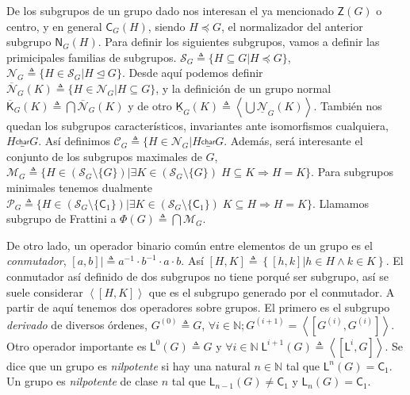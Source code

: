 \documentclass[12pt,a4paper,fleqn,spanish,final,openright]{extbook}
\theoremstyle{definition}
\theoremstyle{remark}
\begin{document}
De los subgrupos de un grupo dado nos interesan el ya mencionado $\mathsf{Z}(G)$
o centro, y en general $\mathsf{C}_{G}(H)$, siendo $H \preccurlyeq G$,
el normalizador del anterior subgrupo $\mathsf{N}_{G}(H)$. Para definir
los siguientes subgrupos, vamos a definir las primicipales familias
de subgrupos. 
$\mathcal{S}_{G}\triangleq\lbrace H \subseteq G\vert H \preccurlyeq G\rbrace$,
$\mathcal{N}_{G}\triangleq\lbrace H \in \mathcal{S}_{G}|H\trianglelefteq G\rbrace$. 
Desde aquí podemos definir 
$\mathcal{\overline N}_{G}(K)\triangleq\lbrace H \in \mathcal{N}_{G}\vert H\subseteq G\rbrace$, 
y la definición de un grupo normal 
${\overline{\mathsf{K}}}_{G}(K)\triangleq\bigcap\mathcal{\overline N}_{G}(K)$ 
y de otro 
${\underline{\mathsf{K}}}_{G}(K)\triangleq\left\langle\bigcup\mathcal{\underline N}_{G}(K)\right\rangle$.
También nos quedan los subgrupos característicos, invariantes ante
isomorfismos cualquiera, $ H \overset{\mathsf{{char}}}{\_} G $. Así definimos
$\mathcal{C}_{G}\triangleq\lbrace H \in \mathcal{N}_{G} \vert H \overset{\mathsf{{char}}}{\_} G$.
Además, será interesante el conjunto de los subgrupos maximales de $G$, 
$\mathcal{M}_{G} \triangleq
\lbrace H \in \left({\mathcal{S}_{G}}\setminus \lbrace G\rbrace\right) \vert
\exists K\in \left({\mathcal{S}_{G}}\setminus \lbrace G\rbrace\right)\; 
H \subseteq K \Rightarrow H=K\rbrace$. 
Para subgrupos minimales tenemos dualmente 
$\mathcal{P}_{G} \triangleq
\lbrace H \in \left({\mathcal{S}_{G}}\setminus \lbrace \mathsf{C}_{1}\rbrace\right) 
\vert \exists K \in \left({\mathcal{S}_{G}}\setminus \lbrace 
\mathsf{C}_{1}\rbrace\right)\; K \subseteq H \Rightarrow H=K\rbrace$. 
Llamamos subgrupo de Frattini a $\Phi (G)\triangleq \bigcap \mathcal{M}_{G}$.

De otro lado, un operador binario común entre elementos de un grupo es el \emph{conmutador}, 
$\left[ a,b \right] |\triangleq a^{-1} \cdot b^{-1} \cdot a \cdot b$. 
Así $\left[{H,K}\right]\triangleq \left\lbrace\left[ h,k \right] 
\vert h  \in H \wedge k \in K\right\rbrace $. 
El conmutador así definido de dos subgrupos no tiene porqué 
ser subgrupo, así se suele considerar $\left\langle{\left[{H,K}\right]}\right\rangle$ 
que es el subgrupo generado por el conmutador. A partir de aquí tenemos dos operadores 
sobre grupos. El primero es el subgrupo \emph{derivado} de diversos órdenes, 
$G^{(0)}\triangleq G$, $\forall i \in \mathds{N}; G^{(i+1)}=
\left\langle\left[ G^{(i)},G^{(i)}\right]\right\rangle$. 
Otro operador importante es $\mathsf{L}^{0}(G)\triangleq G$ y $\forall i \in \mathds{N}\;
\mathsf{L}^{i+1}(G)\triangleq \left\langle\left[{\mathsf{L}^{i},G }\right]\right\rangle$. 
Se dice que un grupo es \emph{nilpotente} si hay una natural $n \in \mathds{N}$ tal que 
$\mathsf{L}^{n}(G)=\mathsf{C}_{1}$. Un grupo es \emph{nilpotente} de clase $n$ tal que 
$\mathsf{L}_{n-1}(G) \neq \mathsf{C}_1$ y $\mathsf{L}_{n}(G)=\mathsf{C}_1$.
\end{document}
